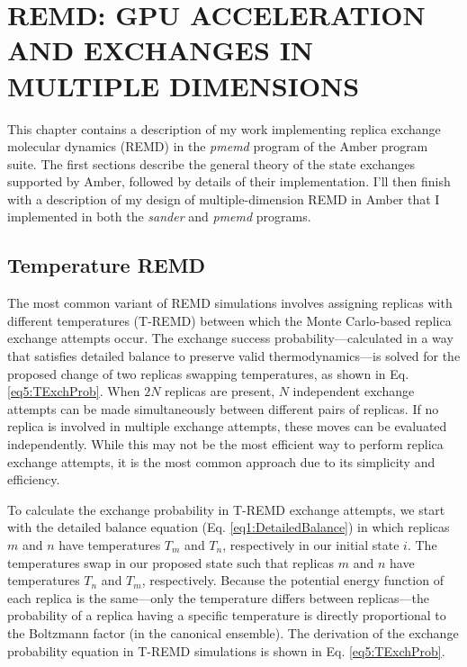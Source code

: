 \chapter{REMD: GPU ACCELERATION AND EXCHANGES IN MULTIPLE DIMENSIONS}
\label{ch5}

This chapter contains a description of my work implementing replica exchange
molecular dynamics (REMD) in the \emph{pmemd} program of the Amber program
suite. \cite{AMBER12} The first sections describe the general theory of the
state exchanges supported by Amber, followed by details of their implementation.
I'll then finish with a description of my design of multiple-dimension REMD in
Amber that I implemented in both the \emph{sander} and \emph{pmemd} programs.

\section{Temperature REMD}

The most common variant of REMD simulations involves assigning replicas with
different temperatures (T-REMD) \cite{Sugita_ChemPhysLett_1999_v314_p141}
between which the Monte Carlo-based replica exchange attempts occur. The
exchange success probability---calculated in a way that satisfies detailed
balance to preserve valid thermodynamics---is solved for the proposed change of
two replicas swapping temperatures, as shown in Eq. \ref{eq5:TExchProb}.  When
$2N$ replicas are present, $N$ independent exchange attempts can be made
simultaneously between different pairs of replicas. If no replica is involved in
multiple exchange attempts, these moves can be evaluated independently. While
this may not be the most efficient way to perform replica exchange attempts, it
is the most common approach due to its simplicity and efficiency.

To calculate the exchange probability in T-REMD exchange attempts, we start with
the detailed balance equation (Eq. \ref{eq1:DetailedBalance}) in which replicas
$m$ and $n$ have temperatures $T_m$ and $T_n$, respectively in our initial state
$i$. The temperatures swap in our proposed state such that replicas $m$ and $n$
have temperatures $T_n$ and $T_m$, respectively. Because the potential energy
function of each replica is the same---only the temperature differs between
replicas---the probability of a replica having a specific temperature is
directly proportional to the Boltzmann factor (in the canonical ensemble). The
derivation of the exchange probability equation in T-REMD simulations is shown
in Eq. \ref{eq5:TExchProb}.

